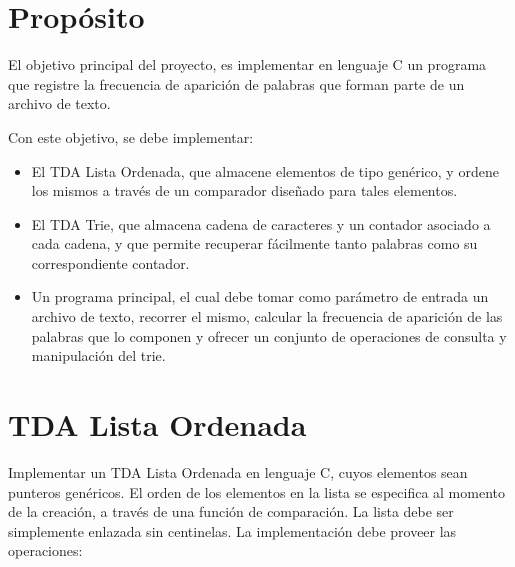 \documentclass[12pt,a4paper]{article}
\begin{document}

\section*{Propósito}
El objetivo principal del proyecto, es implementar en lenguaje C un programa que registre la frecuencia de aparición de palabras que forman parte de un archivo de texto. 

Con este objetivo, se debe implementar:
\begin{itemize}
	
	\item El TDA Lista Ordenada, que almacene elementos de tipo genérico, y ordene los mismos a través de un comparador diseñado para tales elementos.
	
	\item El TDA Trie, que almacena cadena de caracteres y un contador asociado a cada cadena, y que permite recuperar fácilmente tanto palabras como su correspondiente contador.
	
	\item Un programa principal, el cual debe tomar como parámetro de entrada un archivo de texto, recorrer el mismo, calcular la frecuencia de aparición de las palabras que lo componen y ofrecer un conjunto de operaciones de consulta y manipulación del trie.
	
\end{itemize}

\section{TDA Lista Ordenada}
Implementar un TDA Lista Ordenada en lenguaje C, cuyos elementos sean punteros genéricos. El orden de los elementos en la lista se especifica al momento de la creación, a través de una función de comparación. La lista debe ser simplemente enlazada sin centinelas. La implementación debe proveer las operaciones:
\end{document}
